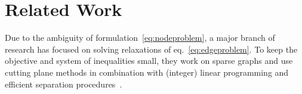 \documentclass[10pt,twocolumn,letterpaper]{article}
\DeclareMathOperator*{\argmin}{arg\,min}
\begin{document}



\section{Related Work}\label{sec:related_work}%
%
Due to the ambiguity of formulation~\ref{eq:nodeproblem},
a major branch of research has focused on solving 
relaxations of eq.~\ref{eq:edgeproblem}.
To keep the objective and system of inequalities small, they 
work on sparse graphs and
use cutting plane methods
in combination with (integer) linear programming and efficient 
separation procedures~\cite{kappes_2011_emmcvpr,andres_2011_iccv,kappes_2013_arxiv}.
\end{document}

